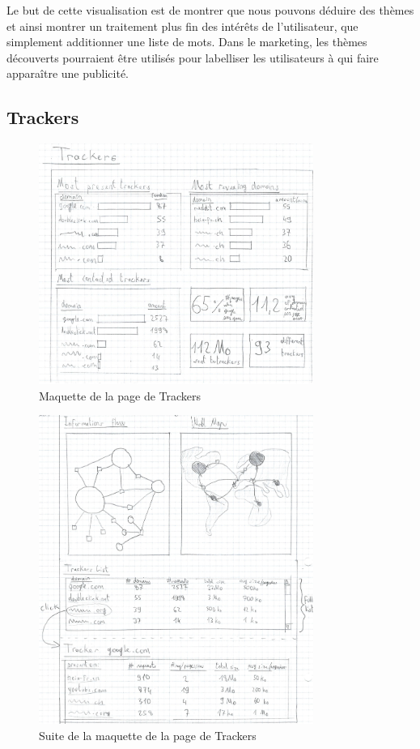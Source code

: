 			Le but de cette visualisation est de montrer que nous pouvons déduire des thèmes et ainsi montrer un traitement plus fin des intérêts de l'utilisateur, que simplement additionner une liste de mots. Dans le marketing, les thèmes découverts pourraient être utilisés pour labelliser les utilisateurs à qui faire apparaître une publicité.

	\subsection{Trackers}

		\begin{figure}[!h]
			\centering
			\includegraphics[width=0.8\textwidth]{images/design/mockup_trackers1}
			\caption{Maquette de la page de Trackers}
			\label{d-mockup-trackers1}
		\end{figure}

		\begin{figure}[!h]
			\centering
			\includegraphics[width=0.8\textwidth]{images/design/mockup_trackers2}
			\caption{Suite de la maquette de la page de Trackers}
			\label{d-mockup-trackers2}
		\end{figure}
